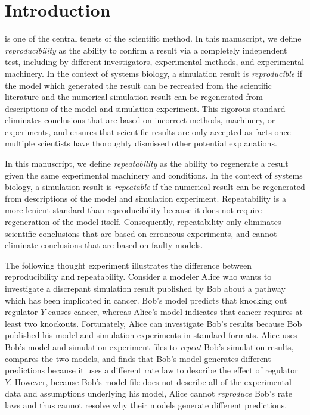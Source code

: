 \documentclass[journal,transmag,twoside]{IEEEtran}
\begin{document}
\section{Introduction}
% 
% 
% 
% 
 is one of the central tenets of the scientific method.
In this manuscript, we define \textit{reproducibility} as the ability to confirm a result via a completely independent test, including by different investigators, experimental methods, and experimental machinery. In the context of systems biology, a simulation result is \textit{reproducible} if the model which generated the result can be recreated from the scientific literature and the numerical simulation result can be regenerated from descriptions of the model and simulation experiment.
This rigorous standard eliminates conclusions that are based on incorrect methods, machinery, or experiments, and ensures that scientific results are only accepted as facts once multiple scientists have thoroughly dismissed other potential explanations. 

In this manuscript, we define \textit{repeatability} as the ability to regenerate a result given the same experimental machinery and conditions. In the context of systems biology, a simulation result is \textit{repeatable} if the numerical result can be regenerated from descriptions of the model and simulation experiment.
Repeatability is a more lenient standard than reproducibility because it does not require regeneration of the model itself. 
Consequently, repeatability only eliminates scientific conclusions that are based on erroneous experiments, and cannot eliminate conclusions that are based on faulty models.

The following thought experiment illustrates the difference between reproducibility and repeatability. Consider a modeler Alice who wants to investigate a discrepant simulation result published by Bob about a pathway which has been implicated in cancer. Bob's model predicts that knocking out regulator $Y$ causes cancer, whereas Alice's model indicates that cancer requires at least two knockouts. Fortunately, Alice can investigate Bob's results because Bob published his model and simulation experiments in standard formats. Alice uses Bob's model and simulation experiment files to \textit{repeat} Bob's simulation results, compares the two models, and finds that Bob's model generates different predictions because it uses a different rate law to describe the effect of regulator $Y$. However, because Bob's model file does not describe all of the experimental data and assumptions underlying his model, Alice cannot \textit{reproduce} Bob's rate laws and thus cannot resolve why their models generate different predictions.
\end{document}
